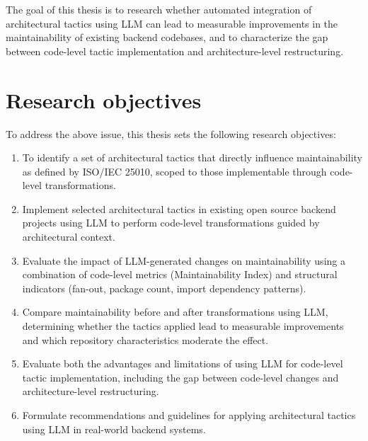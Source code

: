 The goal of this thesis is to research whether automated integration of architectural tactics using LLM can lead to measurable improvements in the maintainability of existing backend codebases, and to characterize the gap between code-level tactic implementation and architecture-level restructuring.

\section{Research objectives}

To address the above issue, this thesis sets the following research objectives:
\begin{enumerate}
    \item To identify a set of architectural tactics that directly influence maintainability as defined by ISO/IEC 25010, scoped to those implementable through code-level transformations.

    \item Implement selected architectural tactics in existing open source backend projects using LLM to perform code-level transformations guided by architectural context.

    \item Evaluate the impact of LLM-generated changes on maintainability using a combination of code-level metrics (Maintainability Index) and structural indicators (fan-out, package count, import dependency patterns).

    \item Compare maintainability before and after transformations using LLM, determining whether the tactics applied lead to measurable improvements and which repository characteristics moderate the effect.

    \item Evaluate both the advantages and limitations of using LLM for code-level tactic implementation, including the gap between code-level changes and architecture-level restructuring.

    \item Formulate recommendations and guidelines for applying architectural tactics using LLM in real-world backend systems.
\end{enumerate}

